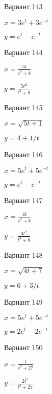 \documentclass[11pt]{report}
\begin{document}
Вариант 143

$x = 3 e^{t} + 3 e^{- t}$

$y = e^{t} - e^{- t}$

Вариант 144

$x = \frac{5 t}{t^{3} + 8}$

$y = \frac{5 t^{2}}{t^{3} + 8}$

Вариант 145

$x = \sqrt{5 t + 1}$

$y = 4 + 1 / t$

Вариант 146

$x = 5 e^{t} + 5 e^{- t}$

$y = e^{t} - e^{- t}$

Вариант 147

$x = \frac{4 t}{t^{3} + 8}$

$y = \frac{3 t^{2}}{t^{3} + 8}$

Вариант 148

$x = \sqrt{4 t + 7}$

$y = 6 + 3 / t$

Вариант 149

$x = 5 e^{t} + 5 e^{- t}$

$y = 2 e^{t} - 2 e^{- t}$

Вариант 150

$x = \frac{t}{t^{3} + 27}$

$y = \frac{2 t^{2}}{t^{3} + 27}$
\end{document}
